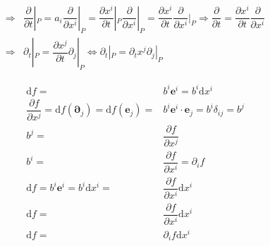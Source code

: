 \documentclass[
]{book}
\theoremstyle{definition}
\theoremstyle{definition}
\theoremstyle{definition}
\theoremstyle{definition}
\theoremstyle{remark}
\begin{document}
\[\begin{aligned}
\Rightarrow & \dfrac{\partial}{\partial t}|_{{\scriptscriptstyle P}}=a_{{\scriptscriptstyle i}}\dfrac{\partial}{\partial x^{{\scriptscriptstyle i}}}|_{{\scriptscriptstyle P}}=\dfrac{\partial x^{{\scriptscriptstyle i}}}{\partial t}|_{{\scriptscriptstyle P}}\dfrac{\partial}{\partial x^{{\scriptscriptstyle i}}}|_{{\scriptscriptstyle P}}=\dfrac{\partial x^{{\scriptscriptstyle i}}}{\partial t}\dfrac{\partial}{\partial x^{{\scriptscriptstyle i}}}|_{{\scriptscriptstyle P}}\Rightarrow\dfrac{\partial}{\partial t}=\dfrac{\partial x^{{\scriptscriptstyle i}}}{\partial t}\dfrac{\partial}{\partial x^{{\scriptscriptstyle i}}}\\
\Rightarrow & \partial_{{\scriptscriptstyle t}}|_{{\scriptscriptstyle P}}=\dfrac{\partial x^{{\scriptscriptstyle j}}}{\partial t}\partial_{{\scriptscriptstyle j}}|_{{\scriptscriptstyle P}}\Leftrightarrow\partial_{{\scriptscriptstyle t}}|_{{\scriptscriptstyle P}}=\partial_{{\scriptscriptstyle t}}x^{{\scriptscriptstyle j}}\partial_{{\scriptscriptstyle j}}|_{{\scriptscriptstyle P}}
\end{aligned}
\]

\[
\begin{aligned}
\mathrm{d}f= & b^{{\scriptscriptstyle i}}\boldsymbol{e}^{{\scriptscriptstyle i}}=b^{{\scriptscriptstyle i}}\mathrm{d}x^{{\scriptscriptstyle i}}\\
\dfrac{\partial f}{\partial x^{{\scriptscriptstyle j}}}=\mathrm{d}f\left(\boldsymbol{\partial}_{{\scriptscriptstyle j}}\right)=\mathrm{d}f\left(\boldsymbol{e}_{{\scriptscriptstyle j}}\right)= & b^{{\scriptscriptstyle i}}\boldsymbol{e}^{{\scriptscriptstyle i}}\cdot\boldsymbol{e}_{{\scriptscriptstyle j}}=b^{{\scriptscriptstyle i}}\delta_{{\scriptscriptstyle ij}}=b^{{\scriptscriptstyle j}}\\
b^{{\scriptscriptstyle j}}= & \dfrac{\partial f}{\partial x^{{\scriptscriptstyle j}}}\\
b^{{\scriptscriptstyle i}}= & \dfrac{\partial f}{\partial x^{{\scriptscriptstyle i}}}=\partial_{{\scriptscriptstyle i}}f\\
\mathrm{d}f=b^{{\scriptscriptstyle i}}\boldsymbol{e}^{{\scriptscriptstyle i}}=b^{{\scriptscriptstyle i}}\mathrm{d}x^{{\scriptscriptstyle i}}= & \dfrac{\partial f}{\partial x^{{\scriptscriptstyle i}}}\mathrm{d}x^{{\scriptscriptstyle i}}\\
\mathrm{d}f= & \dfrac{\partial f}{\partial x^{{\scriptscriptstyle i}}}\mathrm{d}x^{{\scriptscriptstyle i}}\\
\mathrm{d}f= & \partial_{{\scriptscriptstyle i}}f\mathrm{d}x^{{\scriptscriptstyle i}}
\end{aligned}
\]
\end{document}
